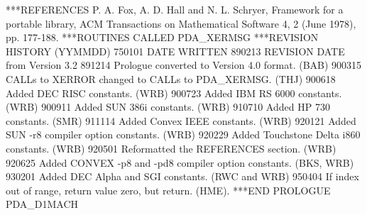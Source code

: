 \documentclass[11pt,twoside,nolof]{starlink}
\begin{document}
\begin{terminalv}
***REFERENCES  P. A. Fox, A. D. Hall and N. L. Schryer, Framework for
                 a portable library, ACM Transactions on Mathematical
                 Software 4, 2 (June 1978), pp. 177-188.
***ROUTINES CALLED  PDA_XERMSG
***REVISION HISTORY  (YYMMDD)
   750101  DATE WRITTEN
   890213  REVISION DATE from Version 3.2
   891214  Prologue converted to Version 4.0 format.  (BAB)
   900315  CALLs to XERROR changed to CALLs to PDA_XERMSG.  (THJ)
   900618  Added DEC RISC constants.  (WRB)
   900723  Added IBM RS 6000 constants.  (WRB)
   900911  Added SUN 386i constants.  (WRB)
   910710  Added HP 730 constants.  (SMR)
   911114  Added Convex IEEE constants.  (WRB)
   920121  Added SUN -r8 compiler option constants.  (WRB)
   920229  Added Touchstone Delta i860 constants.  (WRB)
   920501  Reformatted the REFERENCES section.  (WRB)
   920625  Added CONVEX -p8 and -pd8 compiler option constants.
           (BKS, WRB)
   930201  Added DEC Alpha and SGI constants.  (RWC and WRB)
   950404  If index out of range, return value zero, but return.
           (HME).
***END PROLOGUE  PDA_D1MACH
\end{terminalv}

\end{document}
